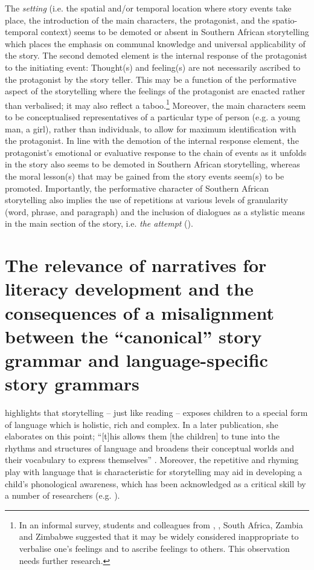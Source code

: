 \documentclass[output=paper,modfonts]{langscibook}
\begin{document}
The \textit{setting} (i.e. the spatial and/or temporal location where story events take place, the introduction of the main characters, the protagonist, and the spatio-temporal context) seems to be demoted or absent in Southern African storytelling which places the emphasis on communal knowledge and universal applicability of the story. The second demoted element is the internal response of the protagonist to the initiating event: Thought(s) and feeling(s) are not necessarily ascribed to the protagonist by the story teller. This may be a function of the performative aspect of the storytelling where the feelings of the protagonist are enacted rather than verbalised; it may also reflect a taboo.\footnote{In an informal survey, students and colleagues from , , South Africa, Zambia and Zimbabwe suggested that it may be widely considered inappropriate to verbalise one’s feelings and to ascribe feelings to others. This observation needs further research.} Moreover, the main characters seem to be conceptualised representatives of a particular type of person (e.g. a young man, a girl), rather than individuals, to allow for maximum identification with the protagonist. In line with the demotion of the internal response element, the protagonist’s emotional or evaluative response to the chain of events as it unfolds in the story also seems to be demoted in Southern African storytelling, whereas the moral lesson(s) that may be gained from the story events seem(s) to be promoted. Importantly, the performative character of Southern African storytelling also implies the use of repetitions at various levels of granularity (word, phrase, and paragraph) and the inclusion of dialogues as a stylistic means in the main section of the story, i.e. \textit{the attempt} (\citealt{Canonici1990,Makgamatha1991,Motshwari1998,Obiechina1992,TappeInPreparation}).


\section{The relevance of narratives for literacy development and the consequences of a misalignment between the “canonical” story grammar and language-specific story grammars}\label{sec:tappe:3}


\citet[46]{Bloch1999} highlights that storytelling – just like reading – exposes children to a special form of language which is holistic, rich and complex. In a later publication, she elaborates on this point; “[t]his allows them [the children] to tune into the rhythms and structures of language and broadens their conceptual worlds and their vocabulary to express themselves” \citep[11]{Bloch2006}. Moreover, the repetitive and rhyming play with language that is characteristic for storytelling may aid in developing a child’s phonological awareness, which has been acknowledged as a critical  skill by a number of researchers (e.g.  \citealt{Goswami1990,DuncanEtAl2013}). 
\end{document}
